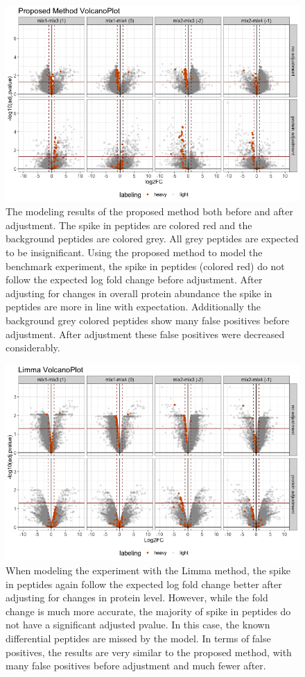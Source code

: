 \documentclass{mcp}
\begin{document}
\begin{figure}[h!]
\centering
\includegraphics[width=.85\textwidth]{sim_new/spike_in_msstatsptm_volcano}
\caption{The modeling results of the proposed method both before and after adjustment. The spike in peptides are colored red and the background peptides are colored grey. All grey peptides are expected to be insignificant. Using the proposed method to model the benchmark experiment, the spike in peptides (colored red) do not follow the expected log fold change before adjustment. After adjusting for changes in overall protein abundance the spike in peptides are more in line with expectation. Additionally the background grey colored peptides show many false positives before adjustment. After adjustment these false positives were decreased considerably. \label{fig:spike_volcano_msstats}}
\end{figure}

\begin{figure}[h!]
\centering
\includegraphics[width=.85\textwidth]{sim_new/spike_in_limma_volcano}
\caption{When modeling the experiment with the Limma method, the spike in peptides again follow the expected log fold change better after adjusting for changes in protein level. However, while the fold change is much more accurate, the majority of spike in peptides do not have a significant adjusted pvalue. In this case, the known differential peptides are missed by the model. In terms of false positives, the results are very similar to the proposed method, with many false positives before adjustment and much fewer after. \label{fig:spike_volcano_limma}}
\end{figure}
\end{document}
